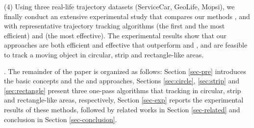 \ni (4) Using three real-life trajectory datasets (ServiceCar, GeoLife, Mopsi), we finally conduct an extensive experimental study that compares our methods \citt, \sitt and \bitt with  representative trajectory tracking algorithms \ldrh (the first and the most efficient) and \grts (the most effective). The experimental results show that our approaches are both efficient and effective that outperform \ldrh and \grts, and are feasible to track a moving object in circular, strip and rectangle-like areas.

.
The remainder of the paper is organized as follows:
Section \ref{sec-pre} introduces the basic concepts and the \ldr and \ldrh approaches,
Sections \ref{sec:circle}, \ref{sec:strip} and \ref{sec:rectangle} present three one-pass algorithms that tracking in circular, strip and rectangle-like areas, respectively,
Section \ref{sec-exp} reports the experimental results of these methods, followed by related works in Section \ref{sec-related} and conclusion in Section \ref{sec-conclusion}.



